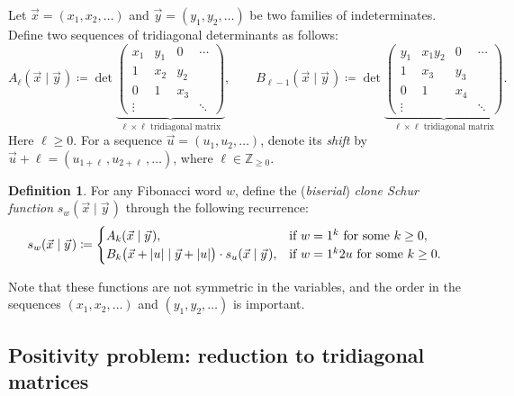 \documentclass[letterpaper,11pt,oneside,reqno]{article}
\numberwithin{equation}{section}
\newcommand{\ssp}{\hspace{1pt}}
\theoremstyle{definition}
\newtheorem{definition}[proposition]{Definition}
\begin{document}
Let $\vec x=(x_1,x_2,\ldots )$ and $\vec y=(y_1,y_2,\ldots)$ be two families of indeterminates.
Define two sequences of tridiagonal determinants as follows:
\begin{equation}
	\label{eq:A_B_dets}
	A_\ell (\vec{x} \mid \vec{y}\ssp) \coloneqq
	\det
	\underbrace{\begin{pmatrix}
	x_1 & y_1 & 0 & \cdots\\
	1 & x_2 & y_2 &\\
	0 & 1 & x_3  & \\
	\vdots & & & \ddots
	\end{pmatrix}}_{\text{$\ell \times \ell $ tridiagonal matrix}} ,
	\qquad
	B_{\ell -1} (\vec{x} \mid \vec{y}\ssp) \coloneqq
	\det
	\underbrace{\begin{pmatrix}
	y_1 & x_1y_2 & 0 & \cdots\\
	1 & x_3 & y_3 &\\
	0 & 1 & x_4 & \\
	\vdots & & & \ddots
	\end{pmatrix}}_{\text{$\ell \times \ell$ tridiagonal matrix}} .
\end{equation}
Here $\ell\ge0$.
For a sequence $\vec u=(u_1,u_2,\ldots)$,
denote its
\emph{shift} by $\vec u+ \ell = (u_{1+\ell} \, ,u_{2+\ell} \, ,\ldots)$, where $\ell\in \mathbb{Z}_{\ge0}$.


\begin{definition}
	\label{def:clone_Schur}
	For any Fibonacci word $w$,
	define the
	(\emph{biserial})
	\emph{clone Schur function} $s_w(\vec{x} \mid \vec{y}\ssp)$ through the following recurrence:
	\begin{equation}
		\label{eq:clone_Schur_recurrence_def}
		s_w (\vec{x} \mid \vec{y}\ssp)
		\coloneqq
		\begin{cases}
			A_k(\vec{x} \mid \vec{y}\ssp), & \textnormal{if $w=1^{k}$ for some $k\ge 0$},\\
			B_k\bigl( \vec{x}+|u| \mid \vec{y}+|u| \bigr)\cdot s_u (\vec{x} \mid \vec{y}\ssp)
			, & \textnormal{if $w=1^k2u$ for some $k\ge 0$}.
		\end{cases}
	\end{equation}
\end{definition}
Note that these functions are not symmetric in the variables,
and the order in the sequences $(x_1,x_2,\ldots)$ and $(y_1,y_2,\ldots)$ is important.

\subsection{Positivity problem: reduction to tridiagonal matrices}
\end{document}
